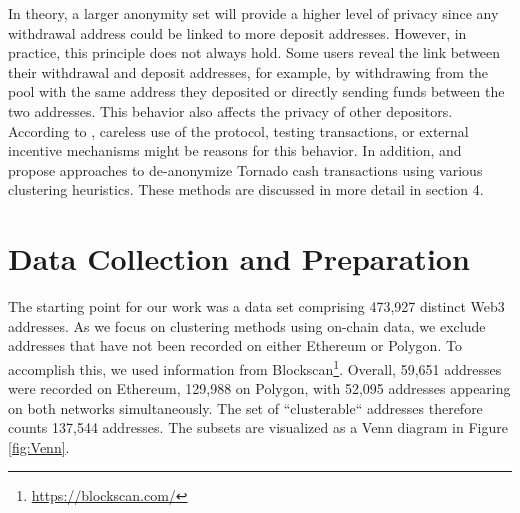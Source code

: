 \documentclass[12pt,a4paper,titlepage,oneside,english]{article}
\begin{document}
In theory, a larger anonymity set will provide a higher level of privacy since any withdrawal address could be linked to more deposit addresses. However, in practice, this principle does not always hold.
Some users reveal the link between their withdrawal and deposit addresses, for example, by withdrawing from the pool with the same address they deposited or directly sending funds between the two addresses. This behavior also affects the privacy of other depositors. According to \cite{nadler2023tornado}, careless use of the protocol, testing transactions, or external incentive mechanisms might be reasons for this behavior. \newline
In addition, \cite{Beres2020} and \cite{wu2022tutela} propose approaches to de-anonymize Tornado cash transactions using various clustering heuristics. These methods are discussed in more detail in section 4.



\section{Data Collection and Preparation} 
The starting point for our work was a data set comprising 473,927 distinct Web3 addresses.
 As we focus on clustering methods using on-chain data, we exclude addresses that have not been recorded on either Ethereum or Polygon. To accomplish this, we used information from Blockscan\footnote{\url{https://blockscan.com/}}. Overall, 59,651 addresses were recorded on Ethereum, 129,988 on Polygon, with 52,095 addresses appearing on both networks simultaneously. The set of ``clusterable`` addresses therefore counts 137,544 addresses. The subsets are visualized as a Venn diagram in Figure \ref{fig:Venn}.
 
\end{document}
